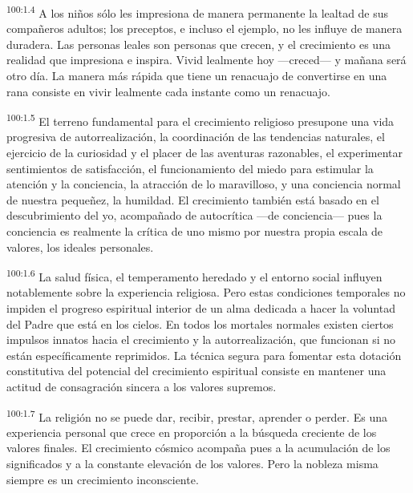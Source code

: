 \par
\textsuperscript{100:1.4} A los niños sólo les impresiona de manera permanente la lealtad de sus compañeros adultos; los preceptos, e incluso el ejemplo, no les influye de manera duradera. Las personas leales son personas que crecen, y el crecimiento es una realidad que impresiona e inspira. Vivid lealmente hoy ---creced--- y mañana será otro día. La manera más rápida que tiene un renacuajo de convertirse en una rana consiste en vivir lealmente cada instante como un renacuajo.

\par
\textsuperscript{100:1.5} El terreno fundamental para el crecimiento religioso presupone una vida progresiva de autorrealización, la coordinación de las tendencias naturales, el ejercicio de la curiosidad y el placer de las aventuras razonables, el experimentar sentimientos de satisfacción, el funcionamiento del miedo para estimular la atención y la conciencia, la atracción de lo maravilloso, y una conciencia normal de nuestra pequeñez, la humildad. El crecimiento también está basado en el descubrimiento del yo, acompañado de autocrítica ---de conciencia--- pues la conciencia es realmente la crítica de uno mismo por nuestra propia escala de valores, los ideales personales.

\par
\textsuperscript{100:1.6} La salud física, el temperamento heredado y el entorno social influyen notablemente sobre la experiencia religiosa. Pero estas condiciones temporales no impiden el progreso espiritual interior de un alma dedicada a hacer la voluntad del Padre que está en los cielos. En todos los mortales normales existen ciertos impulsos innatos hacia el crecimiento y la autorrealización, que funcionan si no están específicamente reprimidos. La técnica segura para fomentar esta dotación constitutiva del potencial del crecimiento espiritual consiste en mantener una actitud de consagración sincera a los valores supremos.

\par
\textsuperscript{100:1.7} La religión no se puede dar, recibir, prestar, aprender o perder. Es una experiencia personal que crece en proporción a la búsqueda creciente de los valores finales. El crecimiento cósmico acompaña pues a la acumulación de los significados y a la constante elevación de los valores. Pero la nobleza misma siempre es un crecimiento inconsciente.

